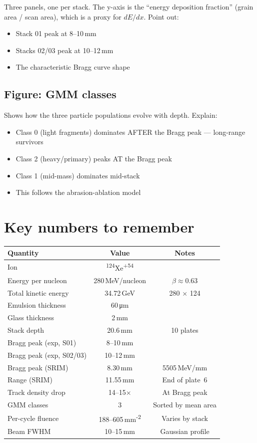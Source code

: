 \documentclass[12pt,a4paper]{article}
\begin{document}
Three panels, one per stack. The y-axis is the ``energy deposition
fraction'' (grain area / scan area), which is a proxy for $dE/dx$.
Point out:
\begin{itemize}
  \item Stack 01 peak at 8--10\,mm
  \item Stacks 02/03 peak at 10--12\,mm
  \item The characteristic Bragg curve shape
\end{itemize}

\subsection{Figure: GMM classes}

Shows how the three particle populations evolve with depth.
Explain:
\begin{itemize}
  \item Class 0 (light fragments) dominates AFTER the Bragg peak
        --- long-range survivors
  \item Class 2 (heavy/primary) peaks AT the Bragg peak
  \item Class 1 (mid-mass) dominates mid-stack
  \item This follows the abrasion-ablation model
\end{itemize}



\section{Key numbers to remember}

\begin{tabular}{lcc}
\toprule
Quantity & Value & Notes \\
\midrule
Ion & \textsuperscript{124}Xe\textsuperscript{+54} \\
Energy per nucleon & 280\,MeV/nucleon & $\beta \approx 0.63$ \\
Total kinetic energy & 34.72\,GeV & 280 $\times$ 124 \\
Emulsion thickness & 60\,\si{\micro\meter} \\
Glass thickness & 2\,mm \\
Stack depth & 20.6\,mm & 10 plates \\
Bragg peak (exp, S01) & 8--10\,mm \\
Bragg peak (exp, S02/03) & 10--12\,mm \\
Bragg peak (SRIM) & 8.30\,mm & 5505\,MeV/mm \\
Range (SRIM) & 11.55\,mm & End of plate~6 \\
Track density drop & 14--15$\times$ & At Bragg peak \\
GMM classes & 3 & Sorted by mean area \\
Per-cycle fluence & 188--605\,mm\textsuperscript{-2} & Varies by stack \\
Beam FWHM & 10--15\,mm & Gaussian profile \\
\bottomrule
\end{tabular}
\end{document}
